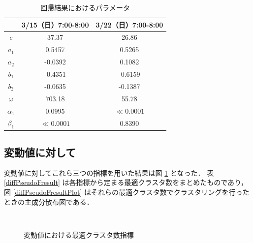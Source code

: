 \documentclass[a4j]{jarticle}
\begin{document}
\begin{table}[tb]
\centering
\caption{回帰結果におけるパラメータ}
\label{0315_07-param}
\begin{tabular}{|c|c|c|}
\hline
&3/15（日）7:00-8:00&3/22（日）7:00-8:00\\
\hline
$c$&37.37&26.86\\
\hline
$a_1$&0.5457&0.5265\\
\hline
$a_2$&-0.0392&0.1082\\
\hline
$b_1$&-0.4351&-0.6159\\
\hline
$b_2$&-0.0635&-0.1387\\
\hline
$\omega$&703.18&55.78\\
\hline
$\alpha_1$&0.0995&$\ll0.0001$\\
\hline
$\beta_1$&$\ll0.0001$&0.8390\\
\hline
\end{tabular}
\end{table}

\newpage
\subsection{変動値に対して}
変動値に対してこれら三つの指標を用いた結果は図 \ref{diffPseudoF} となった．
表 \ref{diffPseudoFresult} は各指標から定まる最適クラスタ数をまとめたものであり，図 \ref{diffPseudoFresultPlot} はそれらの最適クラスタ数でクラスタリングを行ったときの主成分散布図である．

\begin{figure}[tb]
\begin{center}
~
~
\caption{変動値における最適クラスタ数指標}
\label{diffPseudoF}
\end{center}
\end{figure}
\end{document}
